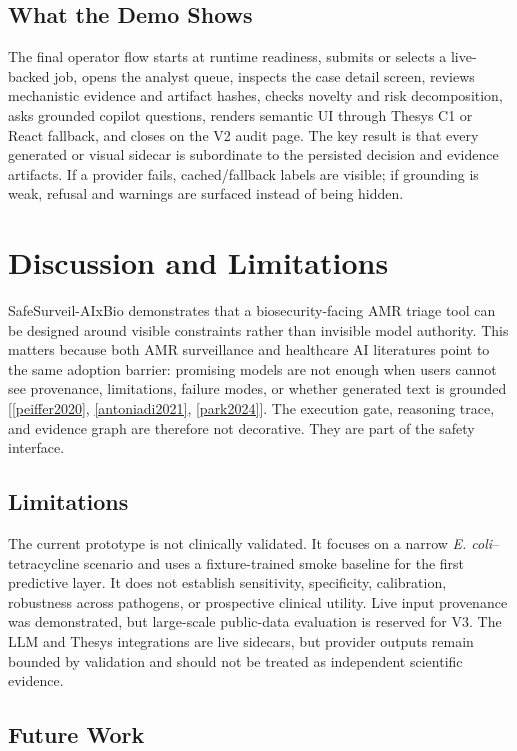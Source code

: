 \documentclass[11pt, letterpaper]{article}
\newcommand{\project}{SafeSurveil-AIxBio}
\begin{document}
\subsection*{What the Demo Shows}

The final operator flow starts at runtime readiness, submits or selects a live-backed job, opens the analyst queue, inspects the case detail screen, reviews mechanistic evidence and artifact hashes, checks novelty and risk decomposition, asks grounded copilot questions, renders semantic UI through Thesys C1 or React fallback, and closes on the V2 audit page. The key result is that every generated or visual sidecar is subordinate to the persisted decision and evidence artifacts. If a provider fails, cached/fallback labels are visible; if grounding is weak, refusal and warnings are surfaced instead of being hidden.

\section{Discussion and Limitations}

\project{} demonstrates that a biosecurity-facing AMR triage tool can be designed around visible constraints rather than invisible model authority. This matters because both AMR surveillance and healthcare AI literatures point to the same adoption barrier: promising models are not enough when users cannot see provenance, limitations, failure modes, or whether generated text is grounded [\ref{peiffer2020}, \ref{antoniadi2021}, \ref{park2024}]. The execution gate, reasoning trace, and evidence graph are therefore not decorative. They are part of the safety interface.

\subsection*{Limitations}

The current prototype is not clinically validated. It focuses on a narrow \textit{E. coli}--tetracycline scenario and uses a fixture-trained smoke baseline for the first predictive layer. It does not establish sensitivity, specificity, calibration, robustness across pathogens, or prospective clinical utility. Live input provenance was demonstrated, but large-scale public-data evaluation is reserved for V3. The LLM and Thesys integrations are live sidecars, but provider outputs remain bounded by validation and should not be treated as independent scientific evidence.

\subsection*{Future Work}
\end{document}
